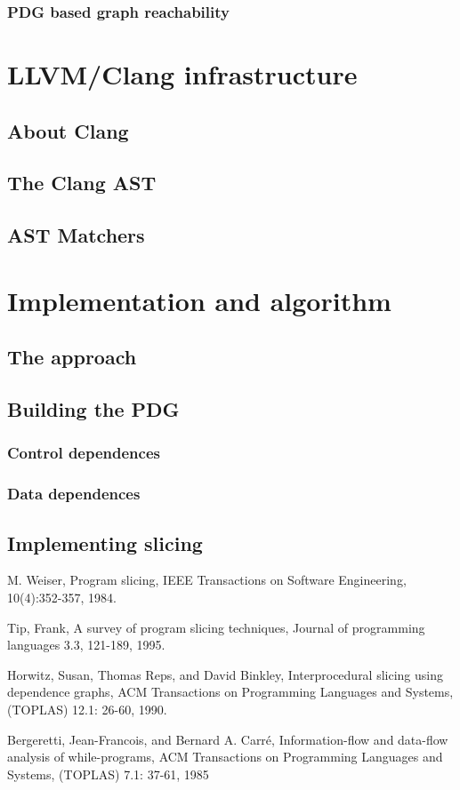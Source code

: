\documentclass[oneside,12pt,a4paper]{book}
\begin{document}
\subsection{PDG based graph reachability}


\chapter{LLVM/Clang infrastructure}
\section{About Clang}
\section{The Clang AST}
\section{AST Matchers}

\chapter{Implementation and algorithm}
\section{The approach}
\section{Building the PDG}
\subsection{Control dependences}
\subsection{Data dependences}

\section{Implementing slicing}


\begin{thebibliography}{Textttext}
  M. Weiser,
  Program slicing,
  IEEE Transactions on Software Engineering,
  10(4):352-357,
  1984.

  Tip, Frank,
  A survey of program slicing techniques,
  Journal of programming languages 3.3,
  121-189,
  1995. 

  Horwitz, Susan, Thomas Reps, and David Binkley,
  Interprocedural slicing using dependence graphs, 
  ACM Transactions on Programming Languages and Systems,
  (TOPLAS) 12.1: 26-60,
  1990.

  Bergeretti, Jean-Francois, and Bernard A. Carré,
  Information-flow and data-flow analysis of while-programs,
  ACM Transactions on Programming Languages and Systems,
  (TOPLAS) 7.1: 37-61,
  1985

\end{thebibliography}
\end{document}
